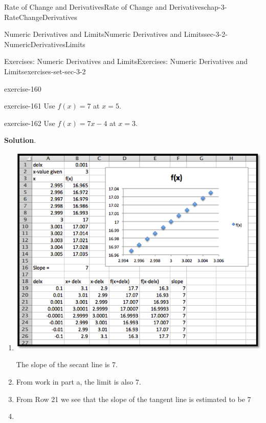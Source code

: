 \documentclass[oneside,10pt,]{book}
\numberwithin{equation}{section}
\begin{document}
\begin{chapterptx}{Rate of Change and Derivatives}{}{Rate of Change and Derivatives}{}{}{chap-3-RateChangeDerivatives}
\begin{sectionptx}{Numeric Derivatives and Limits}{}{Numeric Derivatives and Limits}{}{}{sec-3-2-NumericDerivativesLimits}
\begin{exercises-subsection-numberless}{Exercises: Numeric Derivatives and Limits}{}{Exercises: Numeric Derivatives and Limits}{}{}{exercises-set-sec-3-2}
\begin{exercisegroup}
\begin{divisionexerciseeg}{3}{}{}{exercise-160}
\begin{enumerate}[label=(\alph*)]
\end{enumerate}
\end{divisionexerciseeg}%
\begin{divisionexerciseeg}{4}{}{}{exercise-161}%
\hypertarget{p-1078}{}%
Use \(f(x)=7\) at \(x=5\).%
\end{divisionexerciseeg}%
\begin{divisionexerciseeg}{5}{}{}{exercise-162}%
\hypertarget{p-1079}{}%
Use \(f(x)=7x-4\) at \(x=3\).%
\par\smallskip%
\noindent\textbf{Solution}.\hypertarget{solution-80}{}\quad%
\leavevmode%
\begin{enumerate}[label=(\alph*)]
\item\hypertarget{li-329}{}\leavevmode%
\begin{sidebyside}{1}{0.05}{0.05}{0}%
\begin{sbspanel}{0.9}%
\includegraphics[width=1\linewidth]{images/sec3-2-sol5a.png}
\end{sbspanel}%
\end{sidebyside}%
\par
\hypertarget{p-1080}{}%
The slope of the secant line is 7.%
\item\hypertarget{li-330}{}\hypertarget{p-1081}{}%
From work in part a, the limit is also 7.%
\item\hypertarget{li-331}{}\hypertarget{p-1082}{}%
From Row 21 we see that the slope of the tangent line is estimated to be 7%
\item\hypertarget{li-332}{}\hypertarget{p-1083}{}%
%
\begin{equation*}

\end{equation*}
\end{enumerate}
\end{divisionexerciseeg}
\end{exercisegroup}
\end{exercises-subsection-numberless}
\end{sectionptx}
\end{chapterptx}
\end{document}
